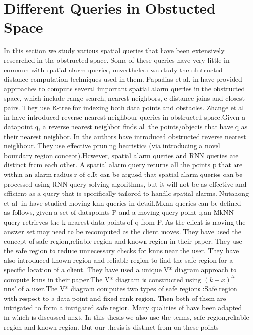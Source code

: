 \section{\label{sec:obstructed}Different Queries in Obstucted Space}
In this section we study various spatial queries that have been extensively researched in the obstructed space. Some of these queries have very little in common with spatial alarm queries, nevertheless we study the obstructed distance computation techniques used in them.
\vspace{5pt}
Papadias et al. in \cite{Obst1} have provided approaches to compute several important spatial alarm queries in the obstructed space, which include range search, nearest neighbors, e-distance joins and closest pairs. They use R-tree for indexing both data points and obstacles.  
\vspace{5pt}
Zhange et al in \cite{obst2} have introduced reverse nearest neighbour queries in obstructed space.Given a datapoint q, a reverse nearest neighbor finds all the points/objects that have q as their nearest neighbor. In \cite{obst2} the authors have introduced obstructed reverse nearest neighbour. They use effective pruning heuristics (via introducing a novel boundary region concept).However, spatial alarm queries and RNN queries are distinct from each other. A spatial alarm query returns all the points p that are within an alarm radius r of q.It can be argued that spatial alarm queries can be processed using RNN query solving algorithms, but it will not be as effective and efficient as a query that is specifically tailored to handle spatial alarms. 
\vspace{5pt}
Nutanong et al. in \cite{mknn} have studied moving knn queries in detail.Mknn queries can be defined as follows, given a set of datapoints P and a moving query point q,an MkNN query retrieves the k nearest data points of q from P. As the client is moving the answer set may need to be recomputed as the client moves. They have used the concept of safe region,reliable region and known region in their paper. They use the safe region to reduce unnecessary checks for knns near the user. They have also introduced known region and reliable region to find the safe region for a specific location of a client. They have used a unique V* diagram approach to compute knns in their paper.The V* diagram is constructed using $(k+x)^{th}$ nns' of a user.The V* diagram computes two types of safe regions :Safe region with respect to a data point and fixed rank region. Then both of them are intrigated to form a intrigated safe region. Many qualities of\cite{mknn} have been adapted in \cite{oknn} which is discussed next. In this thesis we also use the terms, safe region,reliable region and known region. But our thesis is distinct from \cite{mknn} on these points 

